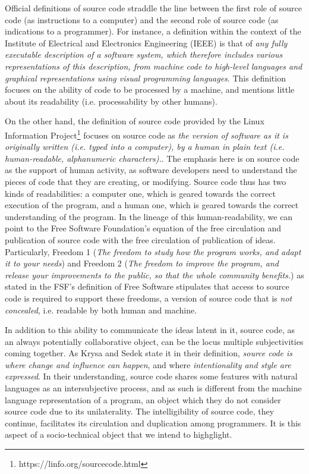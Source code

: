 Official definitions of source code straddle the line between the first role of source code (as instructions to a computer) and the second role of source code (as indications to a programmer). For instance, a definition within the context of the Institute of Electrical and Electronics Engineering (IEEE) is that of \emph{any fully executable description of a software system, which therefore includes various representations of this description, from machine code to high-level languages and graphical representations using visual programming languages}\cite{harman_why_2010}. This definition focuses on the ability of code to be processed by a machine, and mentions little about its readability (i.e. processability by other humans).

On the other hand, the definition of source code provided by the Linux Information Project\footnote{https://linfo.org/sourcecode.html} focuses on source code as \emph{the version of software as it is originally written (i.e. typed into a computer), by a human in plain text (i.e. human-readable, alphanumeric characters).}\cite{noauthor_source_nodate}. The emphasis here is on source code as the support of human activity, as software developers need to understand the pieces of code that they are creating, or modifying. Source code thus has two kinds of readabilities: a computer one, which is geared towards the correct execution of the program, and a human one, which is geared towards the correct understanding of the program. In the lineage of this human-readability, we can point to the Free Software Foundation's equation of the free circulation and publication of source code with the free circulation of publication of ideas. Particularly, Freedom 1 (\emph{The freedom to study how the program works, and adapt it to your needs}) and Freedom 2 (\emph{The freedom to improve the program, and release your improvements to the public, so that the whole community benefits.}\cite{stallman_free_2002}) as stated in the FSF's definition of Free Software stipulates that access to source code is required to support these freedoms, a version of source code that is \emph{not concealed}, i.e. readable by both human and machine.

In addition to this ability to communicate the ideas latent in it, source code, as an always potentially collaborative object, can be the locus multiple subjectivities coming together. As Krysa and Sedek state it in their definition, \emph{source code is where change and influence can happen}, and where \emph{intentionality and style are expressed}\cite{fuller_software_2008}. In their understanding, source code shares some features with natural languages as an intersubjective process\cite{voloshinov_marxism_1986}, and as such is different from the machine language representation of a program, an object which they do not consider source code due to its unilaterality. The intelligibility of source code, they continue, facilitates its circulation and duplication among programmers. It is this aspect of a socio-technical object that we intend to highglight.

